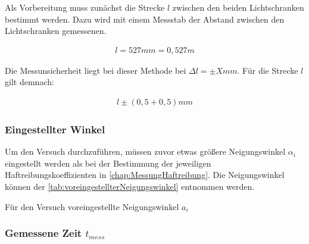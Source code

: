 Als Vorbereitung muss zunächst die Strecke $l$ zwischen den beiden Lichtschranken bestimmt werden.
Dazu wird mit einem Messstab der Abstand zwischen den Lichtschranken gemessenen.

\begin{align*}
    l = 527 mm = 0,527 m
\end{align*}

Die Messunsicherheit liegt bei dieser Methode bei $\Delta l = \pm X mm$. Für die Strecke $l$ gilt demnach:

\begin{align*}
    l \pm (0,5 + 0,5)mm
\end{align*}

\subsubsection{Eingestellter Winkel}

Um den Versuch durchzuführen, müssen zuvor etwas größere Neigungswinkel $\alpha_i$ eingestellt werden als bei der Bestimmung der jeweiligen Haftreibungskoeffizienten in \autoref{chap:MessungHaftreibung}. Die Neigungswinkel können der \autoref{tab:voreingestellterNeigungswinkel} entnommen werden.

\begin{table}[h]
    \center
    \caption[]{Für den Versuch voreingestellte Neigungswinkel $a_i$}
    
    \label{tab:voreingestellterNeigungswinkel}
\end{table}

\subsubsection{Gemessene Zeit $t_{mess}$}
